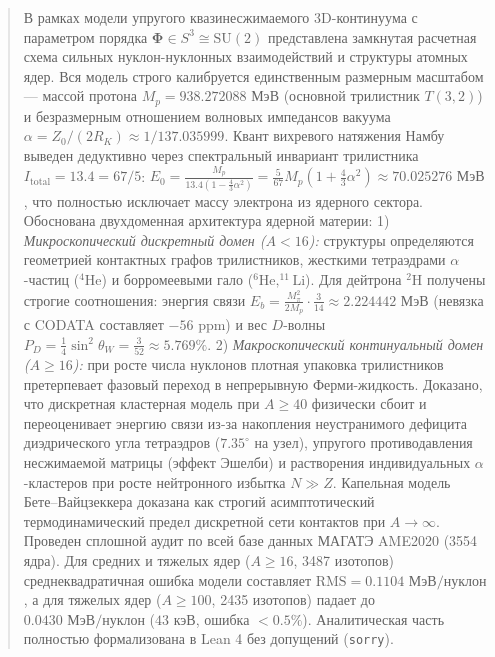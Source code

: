 \documentclass[11pt,a4paper]{article}
\theoremstyle{definition}
\theoremstyle{remark}
\begin{document}
\begin{abstract}
\noindent В рамках модели упругого квазинесжимаемого 3D-континуума с параметром порядка $\boldsymbol{\Phi} \in S^3 \cong \mathrm{SU}(2)$ представлена замкнутая расчетная схема сильных нуклон-нуклонных взаимодействий и структуры атомных ядер. Вся модель строго калибруется единственным размерным масштабом — массой протона $M_p = 938.272088\text{ МэВ}$ (основной трилистник $T(3,2)$) и безразмерным отношением волновых импедансов вакуума $\alpha = Z_0 / (2 R_K) \approx 1/137.035999$. Квант вихревого натяжения Намбу выведен дедуктивно через спектральный инвариант трилистника $I_{\mathrm{total}} = 13.4 = 67/5$: $E_0 = \frac{M_p}{13.4 (1 - \frac{4}{3}\alpha^2)} = \frac{5}{67} M_p (1 + \frac{4}{3}\alpha^2) \approx 70.025276\text{ МэВ}$, что полностью исключает массу электрона из ядерного сектора. Обоснована двухдоменная архитектура ядерной материи: 
1) \textit{Микроскопический дискретный домен ($A < 16$):} структуры определяются геометрией контактных графов трилистников, жесткими тетраэдрами $\alpha$-частиц ($^4\mathrm{He}$) и борромеевыми гало ($^6\mathrm{He}, ^{11}\mathrm{Li}$). Для дейтрона $^2\mathrm{H}$ получены строгие соотношения: энергия связи $E_b = \frac{M_\pi^2}{2 M_p} \cdot \frac{3}{14} \approx 2.224442\text{ МэВ}$ (невязка с CODATA составляет $-56\text{ ppm}$) и вес $D$-волны $P_D = \frac{1}{4}\sin^2\theta_W = \frac{3}{52} \approx 5.769\%$. 
2) \textit{Макроскопический континуальный домен ($A \ge 16$):} при росте числа нуклонов плотная упаковка трилистников претерпевает фазовый переход в непрерывную Ферми-жидкость. Доказано, что дискретная кластерная модель при $A \ge 40$ физически сбоит и переоценивает энергию связи из-за накопления неустранимого дефицита диэдрического угла тетраэдров ($7.35^\circ$ на узел), упругого противодавления несжимаемой матрицы (эффект Эшелби) и растворения индивидуальных $\alpha$-кластеров при росте нейтронного избытка $N \gg Z$. Капельная модель Бете--Вайцзеккера доказана как строгий асимптотический термодинамический предел дискретной сети контактов при $A \to \infty$. 
Проведен сплошной аудит по всей базе данных МАГАТЭ AME2020 (3554 ядра). Для средних и тяжелых ядер ($A \ge 16$, 3487 изотопов) среднеквадратичная ошибка модели составляет $\mathrm{RMS} = 0.1104\text{ МэВ/нуклон}$, а для тяжелых ядер ($A \ge 100$, 2435 изотопов) падает до $\mathbf{0.0430\text{ МэВ/нуклон}}$ ($43\text{ кэВ}$, ошибка $< 0.5\%$). Аналитическая часть полностью формализована в Lean 4 без допущений (\texttt{sorry}).
\end{abstract}
\end{document}

